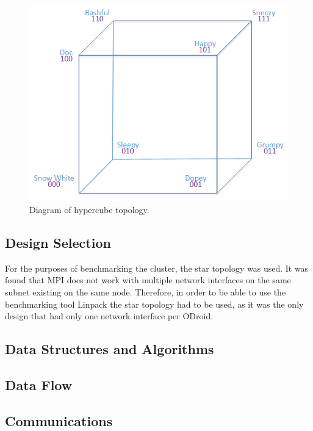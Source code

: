 \begin{figure}[h]
	\caption{Diagram of hypercube topology.}
	\centering
		\includegraphics[scale=0.5]{HyperCube2.png}
\end{figure}


 \subsection{Design Selection}
	For the purposes of benchmarking the cluster, the star topology was used. It was found that MPI does not work with multiple network interfaces on the same subnet existing on the same node. Therefore, in order to be able to use the benchmarking tool Linpack the star topology had to be used, as it was the only design that had only one network interface per ODroid.
 
 \subsection{Data Structures and Algorithms}
	
 
 \subsection{Data Flow}
 
 \subsection{Communications}
 
